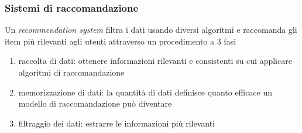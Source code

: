 \begin{frame}
    \frametitle{Sistemi di raccomandazione}
    Un \textit{recommendation system} filtra i dati usando diversi algoritmi e raccomanda gli item più rilevanti agli utenti attraverso 
    un procedimento a 3 fasi
    \begin{enumerate}
        \item \alert{raccolta di dati}: ottenere informazioni rilevanti e consistenti su cui applicare algoritmi di raccomandazione
        \item \alert{memorizzazione di dati}: la quantità di dati definisce quanto efficace un modello di raccomandazione può diventare
        \item \alert{filtraggio dei dati}: estrarre le informazioni più rilevanti
    \end{enumerate}
\end{frame}

